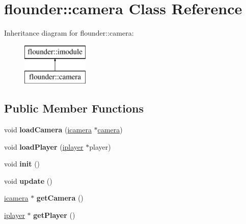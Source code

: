 \hypertarget{classflounder_1_1camera}{}\section{flounder\+:\+:camera Class Reference}
\label{classflounder_1_1camera}
Inheritance diagram for flounder\+:\+:camera\+:\begin{figure}[H]
\begin{center}
\leavevmode
\includegraphics[height=2.000000cm]{classflounder_1_1camera}
\end{center}
\end{figure}
\subsection*{Public Member Functions}
\begin{DoxyCompactItemize}
\item 
\mbox{\label{classflounder_1_1camera_a5dc705a00e4767c237d4255ef23a8d26}} 
void {\bfseries load\+Camera} (\hyperlink{classflounder_1_1icamera}{icamera} $\ast$\hyperlink{classflounder_1_1camera}{camera})
\item 
\mbox{\label{classflounder_1_1camera_a1f7f52edc07cf02dd494f8f7fd24c0b3}} 
void {\bfseries load\+Player} (\hyperlink{classflounder_1_1iplayer}{iplayer} $\ast$player)
\item 
\mbox{\label{classflounder_1_1camera_aa7ef5d0db8dfb9fb7b395b89c08370f4}} 
void {\bfseries init} ()
\item 
\mbox{\label{classflounder_1_1camera_a8cdd1fbf57b04dc8f8391f2fa002038e}} 
void {\bfseries update} ()
\item 
\mbox{\label{classflounder_1_1camera_abc16dba0c44428f99ce65af2c1dac5b8}} 
\hyperlink{classflounder_1_1icamera}{icamera} $\ast$ {\bfseries get\+Camera} ()
\item 
\mbox{\label{classflounder_1_1camera_a662d47759c3b570def49a75981b95bc4}} 
\hyperlink{classflounder_1_1iplayer}{iplayer} $\ast$ {\bfseries get\+Player} ()
\end{DoxyCompactItemize}
